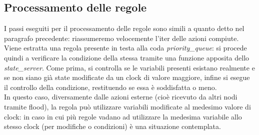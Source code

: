 \documentclass[italian]{memoir}
\begin{document}
\subsection{Processamento delle regole}
I passi eseguiti per il processamento delle regole sono simili a quanto detto nel paragrafo precedente: riassumeremo velocemente l'iter delle azioni compiute.
Viene estratta una regola presente in testa alla coda \textit{priority\_queue}: si procede quindi a verificare la condizione della stessa tramite una funzione apposita dello \textit{state\_server}. Come prima, si controlla se le variabili presenti esistano realmente e se non siano già state modificate da un clock di valore maggiore, infine si esegue il controllo della condizione, restituendo se essa è soddisfatta o meno.\\
In questo caso, diversamente dalle azioni esterne (cioè ricevuto da altri nodi tramite flood), la regola può utilizzare variabili modificate al medesimo valore di clock: in caso in cui più regole vadano ad utilizzare la medesima variabile allo stesso clock (per modifiche o condizioni) è una situazione contemplata.
\end{document}
